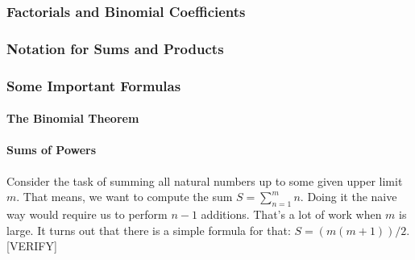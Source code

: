 \subsubsection{Factorials and Binomial Coefficients}




\subsubsection{Notation for Sums and Products}


\subsubsection{Some Important Formulas}

\paragraph{The Binomial Theorem}

\paragraph{Sums of Powers}
Consider the task of summing all natural numbers up to some given upper limit $m$. That means, we want to compute the sum $S = \sum_{n=1}^{m} n$. Doing it the naive way would require us to perform $n-1$ additions. That's a lot of work when $m$ is large. It turns out that there is a simple formula for that: $S = (m (m+1)) / 2$. [VERIFY]






